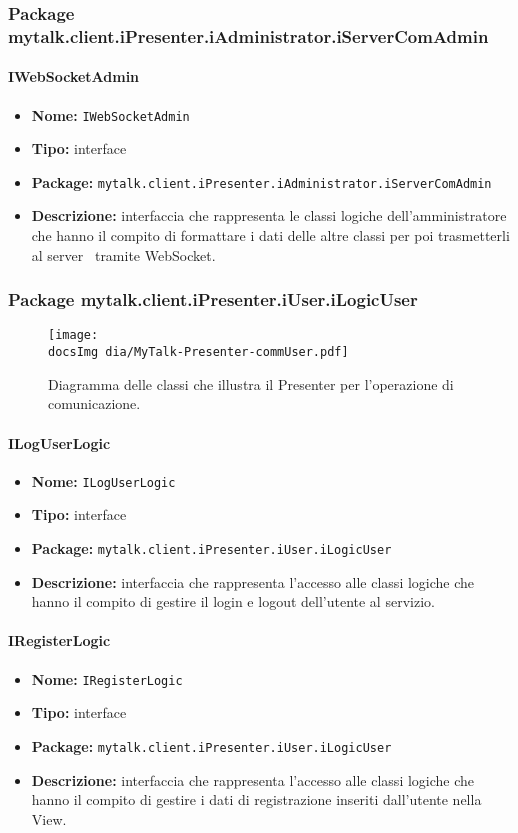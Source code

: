 \subsubsection{Package mytalk.client.iPresenter.iAdministrator.iServerComAdmin}
\paragraph{IWebSocketAdmin}{
	\begin{itemize}
		\item [] \textbf{Nome:} \texttt{IWebSocketAdmin}
		\item [] \textbf{Tipo:} interface
		\item [] \textbf{Package:} \texttt{mytalk.client.iPresenter.iAdministrator.iServerComAdmin}
		\item [] \textbf{Descrizione:}{ interfaccia che rappresenta le classi logiche dell'amministratore che hanno il compito di formattare i dati delle altre classi per poi trasmetterli al server\g~ tramite WebSocket\g.}
	\end{itemize}
}

\subsubsection{Package mytalk.client.iPresenter.iUser.iLogicUser}

\begin{figure}[h!tbp]
		\centering
		\texttt{[image: \\docsImg dia/MyTalk-Presenter-commUser.pdf]}
		\caption{Diagramma delle classi che illustra il Presenter per l'operazione di comunicazione.}
	\end{figure}

\paragraph{ILogUserLogic}{
	\begin{itemize}
		\item [] \textbf{Nome:} \texttt{ILogUserLogic}
		\item [] \textbf{Tipo:} interface
		\item [] \textbf{Package:} \texttt{mytalk.client.iPresenter.iUser.iLogicUser}
		\item [] \textbf{Descrizione:}{ interfaccia che rappresenta l'accesso alle classi logiche che hanno il compito di gestire il login e logout dell'utente al servizio.}
	\end{itemize}
}
\paragraph{IRegisterLogic}{
	\begin{itemize}
		\item [] \textbf{Nome:} \texttt{IRegisterLogic}
		\item [] \textbf{Tipo:} interface
		\item [] \textbf{Package:} \texttt{mytalk.client.iPresenter.iUser.iLogicUser}
		\item [] \textbf{Descrizione:}{ interfaccia che rappresenta l'accesso alle classi logiche che hanno il compito di gestire i dati di registrazione inseriti dall'utente nella View.}
	\end{itemize}
}
